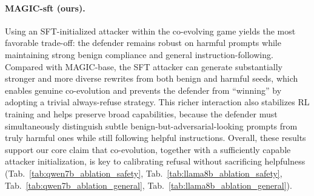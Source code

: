 \documentclass[11pt, letterpaper]{template}
\theoremstyle{plain}
\theoremstyle{definition}
\theoremstyle{remark}
\begin{document}
\paragraph{MAGIC-sft (ours).}
Using an SFT-initialized attacker within the co-evolving game yields the most favorable trade-off: the defender remains robust on harmful prompts while maintaining strong benign compliance and general instruction-following. Compared with MAGIC-base, the SFT attacker can generate substantially stronger and more diverse rewrites from both benign and harmful seeds, which enables genuine co-evolution and prevents the defender from ``winning'' by adopting a trivial always-refuse strategy. This richer interaction also stabilizes RL training and helps preserve broad capabilities, because the defender must simultaneously distinguish subtle benign-but-adversarial-looking prompts from truly harmful ones while still following helpful instructions. Overall, these results support our core claim that co-evolution, together with a sufficiently capable attacker initialization, is key to calibrating refusal without sacrificing helpfulness (Tab.~\ref{tab:qwen7b_ablation_safety}, Tab.~\ref{tab:llama8b_ablation_safety}, Tab.~\ref{tab:qwen7b_ablation_general}, Tab.~\ref{tab:llama8b_ablation_general}).


\end{document}
